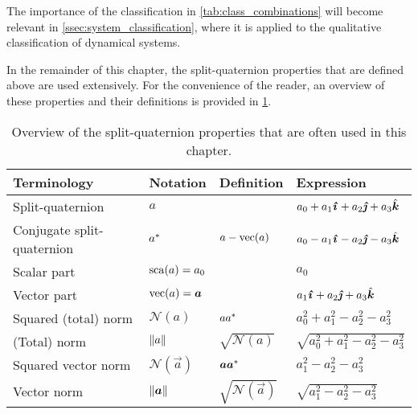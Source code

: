 The importance of the classification in \cref{tab:class_combinations} will become relevant in \cref{ssec:system_classification}, where it is applied to the qualitative classification of dynamical systems.

In the remainder of this chapter, the split-quaternion properties that are defined above are used extensively. For the convenience of the reader, an overview of these properties and their definitions is provided in \cref{tab:spquat_properties}. 

\renewcommand{\arraystretch}{1.3}
\begin{table}[ht!]
    \centering
    \caption{Overview of the split-quaternion properties that are often used in this chapter.}
    \label{tab:spquat_properties}
    \begin{tabular}{llll}
        \toprule
        \textbf{Terminology} & \textbf{Notation} & \textbf{Definition} & \textbf{Expression} \\
        \midrule
        Split-quaternion & \(a\) & &  \(a_0 + a_1\quati + a_2\quatj + a_3\quatk\) \\
        Conjugate split-quaternion &  \(a^*\) & $ a - \mathrm{vec}\qty(a) $ & \(a_0 - a_1\quati - a_2\quatj - a_3\quatk\)\\
        \midrule
        Scalar part & \(\mathrm{sca}\qty(a) = a_0\) & & \(a_0\) \\
        Vector part & \(\vecpart{a} = \vec{a}\) & & \(a_1\quati + a_2\quatj + a_3\quatk\) \\
        \midrule
        Squared (total) norm & \(\mathscr{N}(a)\) & \(aa^*\) &  
        \(a_0^2 + a_1^2 - a_2^2 - a_3^2\) \\
        (Total) norm & \(\norm{a}\) & \(\sqrt{\mathscr{N}(a)}\) & \(\sqrt{a_0^2 + a_1^2 - a_2^2 - a_3^2}\) \\
        \midrule
        Squared vector norm & \(\mathscr{N}(\vec{a})\) & \( \vec{a}\conj{\vec{a}} \) & \( a_1^2 - a_2^2 - a_3^2 \) \\
        Vector norm & \(\norm{\vec{a}}\) & \(\sqrt{\mathscr{N}(\vec{a})}\) & \(\sqrt{a_1^2 - a_2^2 - a_3^2}\) \\
        \bottomrule
    \end{tabular}
\end{table}
\renewcommand{\arraystretch}{1}
 
